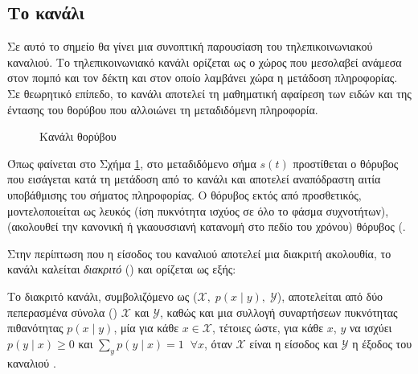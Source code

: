 \subsection*{Το κανάλι}
Σε αυτό το σημείο θα γίνει μια συνοπτική παρουσίαση του τηλεπικοινωνιακού καναλιού. Tο τηλεπικοινωνιακό κανάλι ορίζεται ως ο χώρος που μεσολαβεί ανάμεσα στον πομπό και τον δέκτη και στον οποίο λαμβάνει χώρα η μετάδοση πληροφορίας. Σε θεωρητικό επίπεδο, το κανάλι αποτελεί τη μαθηματική αφαίρεση των ειδών και της έντασης του θορύβου που αλλοιώνει τη μεταδιδόμενη πληροφορία.
\begin{figure}[h]
\caption{Κανάλι  θορύβου}
\label{fig:awgn channel}
\end{figure}

Όπως φαίνεται στο Σχήμα \ref{fig:awgn channel}, στο μεταδιδόμενο σήμα $s(t)$ προστίθεται ο θόρυβος που εισάγεται κατά τη μετάδοση από το κανάλι και αποτελεί αναπόδραστη αιτία υποβάθμισης του σήματος πληροφορίας. Ο θόρυβος εκτός από προσθετικός, μοντελοποιείται ως λευκός (ίση πυκνότητα ισχύος σε όλο το φάσμα συχνοτήτων),  (ακολουθεί την κανονική ή γκαουσσιανή κατανομή στο πεδίο του χρόνου) θόρυβος (.

\vspace{5mm}

Στην περίπτωση που η είσοδος του καναλιού αποτελεί μια διακριτή ακολουθία, το κανάλι καλείται \textit{διακριτό} () και ορίζεται ως εξής:

\begin{definition}
Το διακριτό κανάλι, συμβολιζόμενο ως ($\mathcal{X},\;p(x\mid{y}),\;\mathcal{Y}$), αποτελείται από δύο πεπερασμένα σύνολα () $\mathcal{X}$ και $\mathcal{Y}$, καθώς και μια συλλογή συναρτήσεων πυκνότητας πιθανότητας $p(x\mid{y})$, μία για κάθε $x\in\mathcal{X}$, τέτοιες ώστε, για κάθε $x$, $y$ να ισχύει $p(y\mid{x})\ge0$ και $\sum\nolimits_{y}p(y\mid{x})=1\;\;\forall{x}$, όταν $\mathcal{X}$ είναι η είσοδος και $\mathcal{Y}$ η έξοδος του καναλιού \cite{cover2012elements}.
\label{def:discrete channel}
\end{definition}

